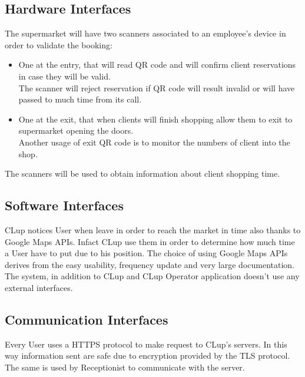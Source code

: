 \subsection{Hardware Interfaces}
The supermarket will have two scanners associated to an employee's device in order to validate the booking:

\par \medskip 
\begin{itemize}
\item One at the entry, that will read QR code and will confirm client reservations in case they will be valid. \\
The scanner will reject reservation if QR code will result invalid or will have passed to much time from its call.
\item One at the exit, that when clients will finish shopping allow them to exit to supermarket opening the doors. \\
Another usage of exit QR code is to monitor the numbers of client into the shop.
\end{itemize} 
\par \medskip 
The scanners will be used to obtain information about client shopping time.

\subsection{Software Interfaces}
CLup notices User when leave in order to reach the market in time also thanks to Google Maps APIs. Infact CLup use them in order to determine how much time a User have to put due to his position.
The choice of using Google Maps APIs derives from the easy usability, frequency update and very large documentation.
The system, in addition to CLup and CLup Operator application doesn't use any external interfaces.


\subsection{Communication Interfaces}
Every User uses a HTTPS protocol to make request to CLup's servers. In this way information sent are safe due to encryption provided by the TLS protocol. The same is used by Receptionist to communicate with the server.

\pagebreak

